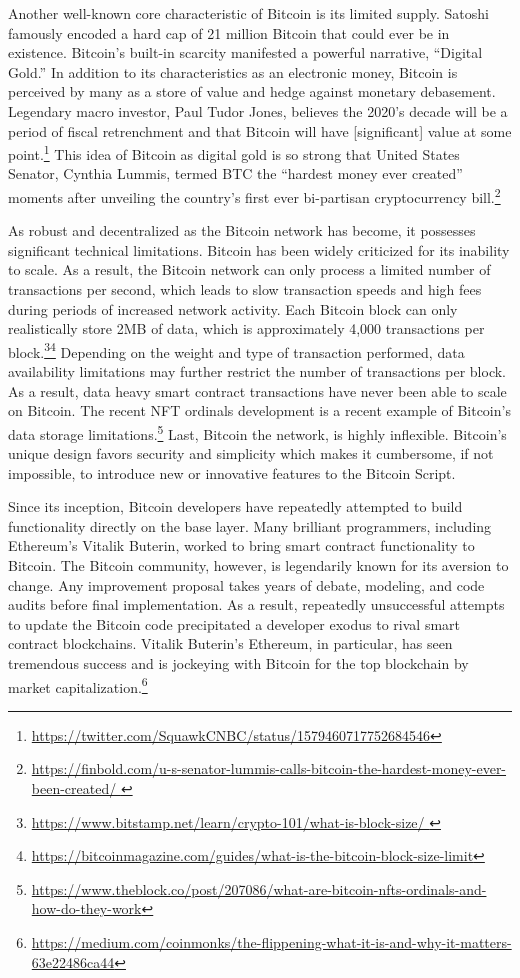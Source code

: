 \documentclass[twoside, a4paper, 11pt]{article}
\begin{document}
  Another well-known core characteristic of Bitcoin is its limited supply. Satoshi famously encoded a hard cap of 21 million Bitcoin that could ever be in existence. Bitcoin’s built-in scarcity manifested a powerful narrative, “Digital Gold.” In addition to its characteristics as an electronic money, Bitcoin is perceived by many as a store of value and hedge against monetary debasement. Legendary macro investor, Paul Tudor Jones, believes the 2020’s decade will be a period of fiscal retrenchment and that Bitcoin will have [significant] value at some point.\footnote{\url{https://twitter.com/SquawkCNBC/status/1579460717752684546}} This idea of Bitcoin as digital gold is so strong that United States Senator, Cynthia Lummis, termed BTC the “hardest money ever created” moments after unveiling the country’s first ever bi-partisan cryptocurrency bill.\footnote{\url{https://finbold.com/u-s-senator-lummis-calls-bitcoin-the-hardest-money-ever-been-created/ }}

  As robust and decentralized as the Bitcoin network has become, it possesses significant technical limitations. Bitcoin has been widely criticized for its inability to scale. As a result, the Bitcoin network can only process a limited number of transactions per second, which leads to slow transaction speeds and high fees during periods of increased network activity. Each Bitcoin block can only realistically store 2MB of data, which is approximately 4,000 transactions per block.\footnote{\url{https://www.bitstamp.net/learn/crypto-101/what-is-block-size/ }}\footnote{\url{https://bitcoinmagazine.com/guides/what-is-the-bitcoin-block-size-limit}} Depending on the weight and type of transaction performed, data availability limitations may further restrict the number of transactions per block. As a result, data heavy smart contract transactions have never been able to scale on Bitcoin. The recent NFT ordinals development is a recent example of Bitcoin’s data storage limitations.\footnote{\url{https://www.theblock.co/post/207086/what-are-bitcoin-nfts-ordinals-and-how-do-they-work}} Last, Bitcoin the network, is highly inflexible. Bitcoin’s unique design favors security and simplicity which makes it cumbersome, if not impossible, to introduce new or innovative features to the Bitcoin Script.

  Since its inception, Bitcoin developers have repeatedly attempted to build functionality directly on the base layer. Many brilliant programmers, including Ethereum’s Vitalik Buterin, worked to bring smart contract functionality to Bitcoin. The Bitcoin community, however, is legendarily known for its aversion to change. Any improvement proposal takes years of debate, modeling, and code audits before final implementation. As a result, repeatedly unsuccessful attempts to update the Bitcoin code precipitated a developer exodus to rival smart contract blockchains. Vitalik Buterin’s Ethereum, in particular, has seen tremendous success and is jockeying with Bitcoin for the top blockchain by market capitalization.\footnote{\url{https://medium.com/coinmonks/the-flippening-what-it-is-and-why-it-matters-63e22486ca44}}
\end{document}
